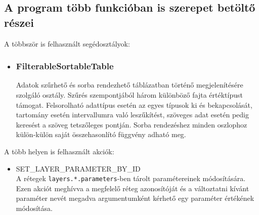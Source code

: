 \subsection{A program több funkcióban is szerepet betöltő részei}

\noindent A többször is felhasznált segédosztályok:

\begin{itemize}

\item\subsubsection{FilterableSortableTable}
Adatok szűrhető és sorba rendezhető táblázatban történő megjelenítésére szolgáló
osztály. Szűrés szempontjából három különböző fajta értéktípust támogat.
Felsorolható adattípus esetén az egyes típusok ki és bekapcsolását, tartomány
esetén intervallumra való leszűkítést, szöveges adat esetén pedig keresést a
szöveg tetszőleges pontján. Sorba rendezéshez minden oszlophoz külön-külön saját
összehasonlító függvény adható meg.

\end{itemize}

\noindent A több helyen is felhasznált akciók:
\begin{itemize}

\item SET\_LAYER\_PARAMETER\_BY\_ID \\
A rétegek \verb|layers.*.parameters|-ben tárolt paramétereinek módosítására.
Ezen akciót meghívva a megfelelő réteg azonosítóját és a változtatni kívánt
paraméter nevét megadva argumentumként kérhető egy paraméter értékének
módosítása.

\end{itemize}


